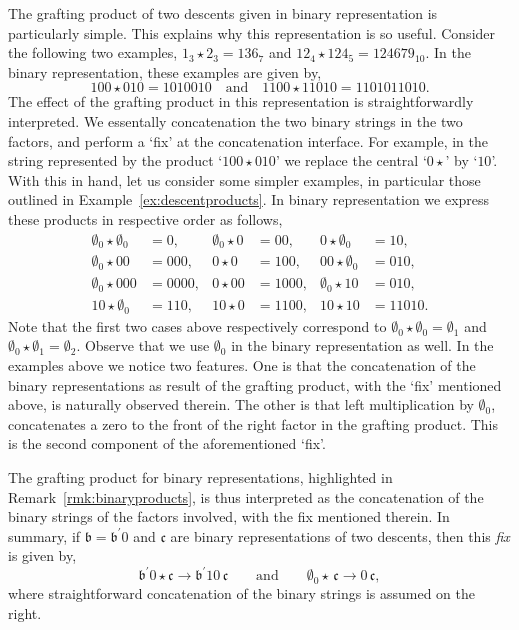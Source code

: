 \documentclass[5p,twocolumn]{elsarticle}
\begin{document}
\begin{remark}\label{rmk:binaryproducts}
The grafting product of two descents given in binary representation is particularly simple. This explains why this representation is so useful.
Consider the following two examples, $1_3\star2_3=136_7$ and $12_4\star124_5=124679_{10}$.
In the binary representation, these examples are given by,
\begin{equation*}
  100\star010=1010010
  \quad\text{and}\quad
  1100\star11010=1101011010.
\end{equation*}
The effect of the grafting product in this representation is straightforwardly interpreted.
We essentally concatenation the two binary strings in the two factors, and perform a `fix' at the concatenation interface.
For example, in the string represented by the product `$100\star010$' we replace the central `$0\star$' by `$10$'. 
With this in hand, let us consider some simpler examples, in particular those outlined in Example~\ref{ex:descentproducts}.
In binary representation we express these products in respective order as follows, 
\begin{align*}
  \emptyset_0\star\emptyset_0 &=0,  &\!\! \emptyset_0\star  0&=00,   &\!\! 0\star\emptyset_0&=10,  \\
  \emptyset_0\star00&=000,          &\!\!             0\star0&=100,  &\!\! 00\star\emptyset_0&=010, \\
  \emptyset_0\star000&=0000,        &\!\!            0\star00&=1000, &\!\! \emptyset_0\star10&=010,  \\
  10\star\emptyset_0&=110,          &\!\!            10\star0&=1100, &\!\! 10\star10&=11010.
\end{align*}
Note that the first two cases above respectively correspond to $\emptyset_0\star\emptyset_0=\emptyset_1$ and $\emptyset_0\star\emptyset_1=\emptyset_2$.
Observe that we use $\emptyset_0$ in the binary representation as well. 
In the examples above we notice two features.
One is that the concatenation of the binary representations as result of the grafting product, with the `fix' mentioned above, is naturally observed therein.
The other is that left multiplication by $\emptyset_0$, concatenates a zero to the front of the right factor in the grafting product. This is the second component of the aforementioned `fix'.
\end{remark}
%
\begin{remark}\label{rmk:twofixes}
  The grafting product for binary representations, highlighted in Remark~\ref{rmk:binaryproducts}, is thus interpreted as the concatenation of the binary strings of the factors involved,
  with the fix mentioned therein. In summary, if $\mathfrak{b}=\mathfrak{b}^\prime0$ and $\mathfrak{c}$ are binary representations of two descents, then this \emph{fix} is given by, 
  \begin{equation}\label{eq:fix}
    \mathfrak{b}^\prime0\star\mathfrak{c}\to\mathfrak{b}^\prime10\,\mathfrak{c}\qquad\text{and}\qquad \emptyset_0\star\,\mathfrak{c}\to0\,\mathfrak{c},  
  \end{equation}
  where straightforward concatenation of the binary strings is assumed on the right.
\end{remark}
%
\end{document}
